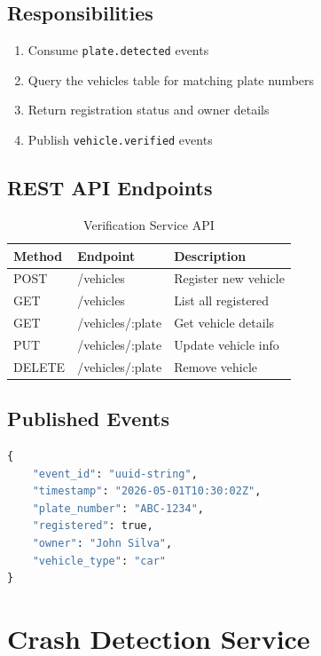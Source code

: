 \documentclass[12pt,a4paper]{report}
\begin{document}
\subsection{Responsibilities}
\begin{enumerate}
    \item Consume \texttt{plate.detected} events
    \item Query the vehicles table for matching plate numbers
    \item Return registration status and owner details
    \item Publish \texttt{vehicle.verified} events
\end{enumerate}

\subsection{REST API Endpoints}
\begin{table}[H]
\centering
\caption{Verification Service API}
\begin{tabular}{|l|l|l|}
\hline
\textbf{Method} & \textbf{Endpoint} & \textbf{Description} \\
\hline
POST & /vehicles & Register new vehicle \\
\hline
GET & /vehicles & List all registered \\
\hline
GET & /vehicles/:plate & Get vehicle details \\
\hline
PUT & /vehicles/:plate & Update vehicle info \\
\hline
DELETE & /vehicles/:plate & Remove vehicle \\
\hline
\end{tabular}
\end{table}

\subsection{Published Events}
\begin{lstlisting}[language=Python, caption=vehicle.verified.v1 Event Schema]
{
    "event_id": "uuid-string",
    "timestamp": "2026-05-01T10:30:02Z",
    "plate_number": "ABC-1234",
    "registered": true,
    "owner": "John Silva",
    "vehicle_type": "car"
}
\end{lstlisting}


\section{Crash Detection Service}
\end{document}
